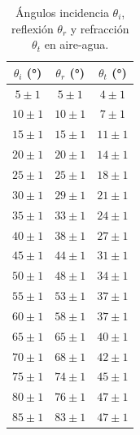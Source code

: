 \documentclass[a4paper,twocolumn]{article}
\begin{document}
            \begin{table}[!ht]
        		\centering
        		\caption{Ángulos incidencia $\theta_i$, reflexión $\theta_r$ y refracción $\theta_t$ en aire-agua.}
        		\vspace{0.1cm}
        		\begin{tabular}{ccc} %
        			
        			\toprule %
        			
        			$\theta_i$ (°) & $\theta_r$ (°) & $\theta_t$ (°) \\
        			
        			\midrule %
        			
        			$5 \pm 1$   & $5 \pm 1$     & $4 \pm 1$ \\
        			$10 \pm 1$  & $10 \pm 1$     & $7 \pm 1$ \\
        			$15 \pm 1$  & $15 \pm 1$     & $11 \pm 1$ \\
        			$20 \pm 1$  & $20 \pm 1$     & $14 \pm 1$ \\
        			$25 \pm 1$  & $25 \pm 1$     & $18 \pm 1$ \\
        			$30 \pm 1$  & $29 \pm 1$     & $21 \pm 1$ \\
        			$35 \pm 1$  & $33 \pm 1$     & $24 \pm 1$ \\
        			$40 \pm 1$  & $38 \pm 1$     & $27 \pm 1$ \\
        			$45 \pm 1$  & $44 \pm 1$     & $31 \pm 1$ \\
        			$50 \pm 1$  & $48 \pm 1$     & $34 \pm 1$ \\
        			$55 \pm 1$  & $53 \pm 1$     & $37 \pm 1$ \\
        			$60 \pm 1$  & $58 \pm 1$     & $37 \pm 1$ \\
        			$65 \pm 1$  & $65 \pm 1$     & $40 \pm 1$ \\
        			$70 \pm 1$  & $68 \pm 1$     & $42 \pm 1$ \\
        			$75 \pm 1$  & $74 \pm 1$     & $45 \pm 1$ \\
        			$80 \pm 1$  & $76 \pm 1$     & $47 \pm 1$ \\
        			$85 \pm 1$  & $83 \pm 1$     & $47 \pm 1$ \\
        			
        			\bottomrule 
        			
        		\end{tabular}
        		\label{tab:AngAirAgu}
        	\end{table}
\end{document}
